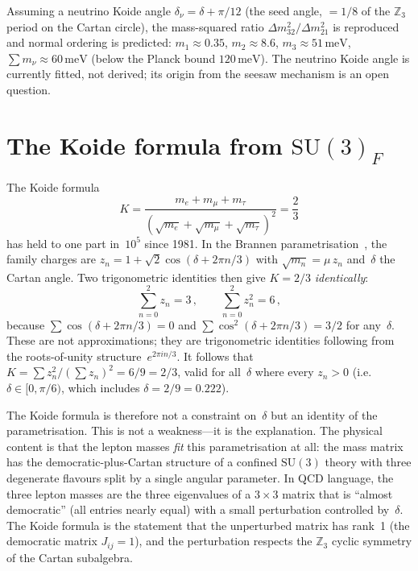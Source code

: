 \documentclass[aps,prd,twocolumn,showpacs,preprintnumbers,superscriptaddress]{revtex4-2}
\newcommand{\SU}{\mathrm{SU}}
\begin{document}
Assuming a neutrino Koide angle
$\delta_\nu = \delta + \pi/12$
(the seed angle, $= 1/8$ of the $\mathbb{Z}_3$ period
on the Cartan circle), the mass-squared ratio
$\Delta m^2_{32}/\Delta m^2_{21}$ is reproduced and
normal ordering is predicted:
$m_1 \approx 0.35$, $m_2 \approx 8.6$,
$m_3 \approx 51\,\mathrm{meV}$,
$\sum m_\nu \approx 60\,\mathrm{meV}$
(below the Planck bound $120\,\mathrm{meV}$).
The neutrino Koide angle is currently fitted, not derived;
its origin from the seesaw mechanism is an open question.

\section{The Koide formula from $\SU(3)_F$}
\label{sec:koide}

The Koide formula~\cite{Koide:1983}
\begin{equation}
  K = \frac{m_e + m_\mu + m_\tau}{(\sqrt{m_e}
  + \sqrt{m_\mu} + \sqrt{m_\tau})^2} = \frac{2}{3}
  \label{eq:koide}
\end{equation}
has held to one part in~$10^5$ since 1981.
In the Brannen parametrisation~\cite{Brannen:2006},
the family charges are
$z_n = 1 + \sqrt{2}\cos(\delta + 2\pi n/3)$
with $\sqrt{m_n} = \mu\,z_n$ and~$\delta$ the Cartan angle.
Two trigonometric identities then give $K = 2/3$
\emph{identically}:
\begin{equation}
  \sum_{n=0}^2 z_n = 3\,,\qquad
  \sum_{n=0}^2 z_n^2 = 6\,,
  \label{eq:trig_identities}
\end{equation}
because $\sum\cos(\delta + 2\pi n/3) = 0$ and
$\sum\cos^2(\delta + 2\pi n/3) = 3/2$ for any~$\delta$.
These are not approximations; they are trigonometric
identities following from the roots-of-unity
structure~$e^{2\pi i n/3}$.
It follows that
$K = \sum z_n^2 / (\sum z_n)^2 = 6/9 = 2/3$,
valid for all~$\delta$ where every $z_n > 0$
(i.e.\ $\delta \in [0, \pi/6)$, which includes
$\delta = 2/9 = 0.222$).

The Koide formula is therefore not a constraint on~$\delta$
but an identity of the parametrisation.  This is not a
weakness---it is the explanation.
The physical content is that the lepton masses \emph{fit}
this parametrisation at all: the mass matrix has the
democratic-plus-Cartan structure of a confined $\SU(3)$
theory with three degenerate flavours split by a single
angular parameter.
In QCD language, the three lepton masses are the three
eigenvalues of a $3 \times 3$ matrix that is ``almost
democratic'' (all entries nearly equal) with a small
perturbation controlled by~$\delta$.
The Koide formula is the statement that the unperturbed
matrix has rank~1 (the democratic matrix
$J_{ij} = 1$), and the perturbation respects the
$\mathbb{Z}_3$ cyclic symmetry of the Cartan subalgebra.
\end{document}
